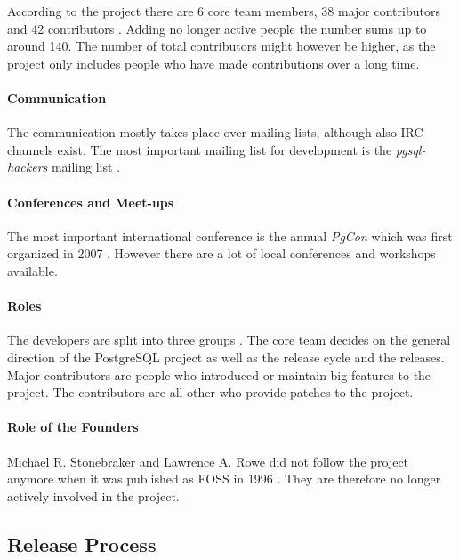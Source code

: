 According to the project there are 6 core team members, 38 major contributors
and 42 contributors \cite{PostgreSQLContributors}. Adding no longer active
people the number sums up to around 140. The number of total contributors
might however be higher, as the project only includes people who have made
contributions over a long time.

\paragraph{Communication}

The communication mostly takes place over mailing lists, although also \ac{IRC}
channels exist. The most important mailing list for development is the
\emph{pgsql-hackers} mailing list \cite{PostgreSQLDevFAQ}.

\paragraph{Conferences and Meet-ups}

The most important international conference is the annual \emph{PgCon} which
was first organized in 2007 \cite{PostgreSQLEvents}. However there are a lot of
local conferences and workshops available.

\paragraph{Roles}

The developers are split into three groups \cite{PostgreSQLContributors}. The
core team decides on the general direction of the PostgreSQL project as well as
the release cycle and the releases. Major contributors are people who
introduced or maintain big features to the project. The contributors are all
other who provide patches to the project.

\paragraph{Role of the Founders}

Michael R. Stonebraker and Lawrence A. Rowe did not follow the project anymore
when it was published as \ac{FOSS} in 1996 \cite{PostgreSQLHistory}. They are
therefore no longer actively involved in the project.

\subsection{Release Process}

